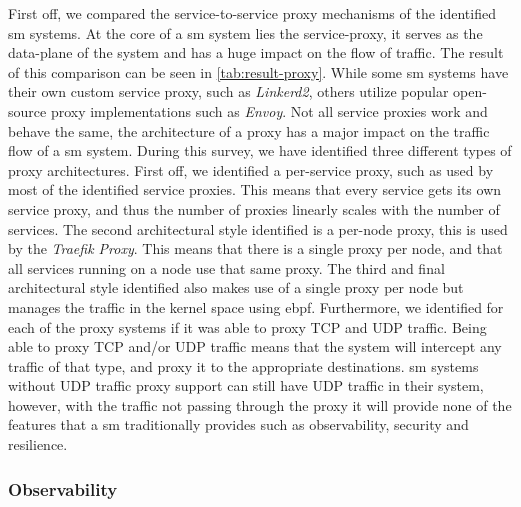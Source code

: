 First off, we compared the service-to-service proxy mechanisms of the identified \gls{sm} systems. At the core of a \gls{sm} system lies the service-proxy, it serves as the data-plane of the system and has a huge impact on the flow of traffic. The result of this comparison can be seen in \cref{tab:result-proxy}. While some \gls{sm} systems have their own custom service proxy, such as \textit{Linkerd2}, others utilize popular open-source proxy implementations such as \textit{Envoy}. Not all service proxies work and behave the same, the architecture of a proxy has a major impact on the traffic flow of a \gls{sm} system. During this survey, we have identified three different types of proxy architectures. First off, we identified a per-service proxy, such as used by most of the identified service proxies. This means that every service gets its own service proxy, and thus the number of proxies linearly scales with the number of services. The second architectural style identified is a per-node proxy, this is used by the \textit{Traefik Proxy}. This means that there is a single proxy per node, and that all services running on a node use that same proxy. The third and final architectural style identified also makes use of a single proxy per node but manages the traffic in the kernel space using \gls{ebpf}. Furthermore, we identified for each of the proxy systems if it was able to proxy TCP and UDP traffic. Being able to proxy TCP and/or UDP traffic means that the system will intercept any traffic of that type, and proxy it to the appropriate destinations. \Gls{sm} systems without UDP traffic proxy support can still have UDP traffic in their system, however, with the traffic not passing through the proxy it will provide none of the features that a \gls{sm} traditionally provides such as observability, security and resilience.


\subsubsection{Observability}
\label{sec:survey:results:comparison:observability}



